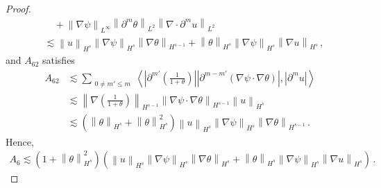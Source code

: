 \documentclass[reqno,11pt]{amsart}
\numberwithin{equation}{section}
\def\p{\partial}
\begin{document}
\begin{proof}
\begin{equation*}
\begin{aligned}
&\quad + \left\| \nabla \psi \right\|_{L^\infty} \left\| \p^m \theta \right\|_{L^2} \left\| \nabla \cdot \partial^m u \right\|_{L^2} \\
&\lesssim \left\| u \right\|_{H^s} \left\| \nabla \psi \right\|_{H^s} \left\| \nabla \theta \right\|_{H^{s-1}} + \left\| \theta \right\|_{H^s} \left\| \nabla \psi \right\|_{H^s} \left\|\nabla u \right\|_{H^s} \,,
\end{aligned}
\end{equation*}
and $A_{62}$ satisfies
\begin{equation*}
\begin{aligned}
A_{62}&\lesssim \sum_{\substack{0 \neq m' \leq m}} \left\langle \left| \partial^{m'} \left( \frac{1}{1+\theta} \right) \right| \left| \partial^{m - m'} \left( \nabla \psi \cdot \nabla \theta \right) \right|, \left| \partial^m u \right| \right\rangle \\
&\lesssim \left\| \nabla \left( \frac{1}{1+\theta} \right) \right\|_{H^{s-1}} \left\| \nabla \psi \cdot \nabla \theta \right\|_{H^{s-1}} \left\| u \right\|_{H^s} \\
&\lesssim \left( \left\| \theta \right\|_{H^s} + \left\| \theta \right\|_{H^s}^2 \right) \left\| u \right\|_{H^s} \left\| \nabla \psi \right\|_{H^s} \left\| \nabla \theta \right\|_{H^{s-1}} \,.
\end{aligned}
\end{equation*}
Hence,
\begin{equation}\label{u-eq8}
\begin{aligned}
A_6 \lesssim \left( 1 + \left\| \theta \right\|_{H^s}^2 \right) \left( \left\| u \right\|_{H^s} \left\| \nabla \psi \right\|_{H^s} \left\| \nabla \theta \right\|_{H^s} + \left\| \theta \right\|_{H^s} \left\| \nabla \psi \right\|_{H^s} \left\|\nabla u \right\|_{H^s} \right) \,.
\end{aligned}
\end{equation}


\end{proof}
\end{document}
